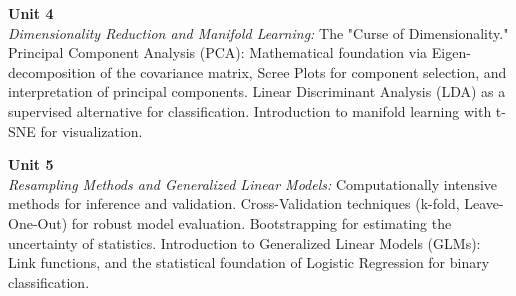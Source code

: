 \noindent\textbf{Unit 4} \\
\textit{Dimensionality Reduction and Manifold Learning:} The "Curse of Dimensionality." Principal Component Analysis (PCA): Mathematical foundation via Eigen-decomposition of the covariance matrix, Scree Plots for component selection, and interpretation of principal components. Linear Discriminant Analysis (LDA) as a supervised alternative for classification. Introduction to manifold learning with t-SNE for visualization.

\vspace{0.3cm}

\noindent\textbf{Unit 5} \\
\textit{Resampling Methods and Generalized Linear Models:} Computationally intensive methods for inference and validation. Cross-Validation techniques (k-fold, Leave-One-Out) for robust model evaluation. Bootstrapping for estimating the uncertainty of statistics. Introduction to Generalized Linear Models (GLMs): Link functions, and the statistical foundation of Logistic Regression for binary classification.

\newpage
{}